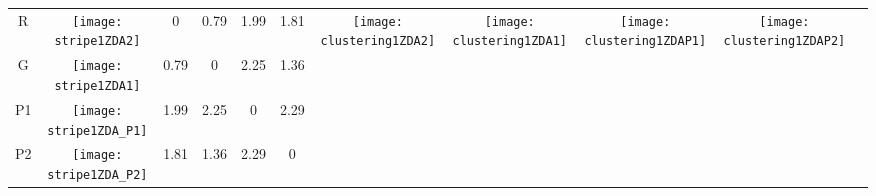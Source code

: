 \documentclass[a4paper,11pt,twoside]{book}%
\begin{document}
\begin{appendices}
\begin{sidewaystable}[h!]
\begin{tabular*}{4cm}{cc|c|c|c|c|c|c|c|c|c|}
\cline{1-10}
\multicolumn{1}{|c|}{R} & \texttt{[image: stripe1ZDA2]} & 0 & 0.79 & 1.99 & 1.81 & \multirow{4}{*}{\vspace{-0.3cm}\texttt{[image: clustering1ZDA2]}} & \multirow{4}{*}{\vspace{-0.3cm}\texttt{[image: clustering1ZDA1]}} & \multirow{4}{*}{\vspace{-0.3cm}\texttt{[image: clustering1ZDAP1]}} & \multirow{4}{*}{\vspace{-0.3cm}\texttt{[image: clustering1ZDAP2]}} &  \multirow{5}{*}{} \\
\cline{1-6}
\multicolumn{1}{|c|}{G} & \texttt{[image: stripe1ZDA1]} & 0.79 & 0 & 2.25 & 1.36 & \multirow{4}{*}{} & \multirow{4}{*}{} & \multirow{4}{*}{} & \multirow{4}{*}{} & \multirow{5}{*}{} \\
\cline{1-6}
\multicolumn{1}{|c|}{P1} & \texttt{[image: stripe1ZDA\_P1]} & 1.99 & 2.25 & 0 & 2.29 & \multirow{4}{*}{} & \multirow{4}{*}{} & \multirow{4}{*}{} & \multirow{4}{*}{} & \multirow{5}{*}{}  \\
\cline{1-6}
\multicolumn{1}{|c|}{P2} & \texttt{[image: stripe1ZDA\_P2]} & 1.81 & 1.36 & 2.29 & 0 & \multirow{4}{*}{} & \multirow{4}{*}{} & \multirow{4}{*}{} & \multirow{4}{*}{} & \multirow{5}{*}{}  \\
\cline{1-11}
\end{tabular*}
\normalfont
\end{sidewaystable}



\end{appendices}
\end{document}
